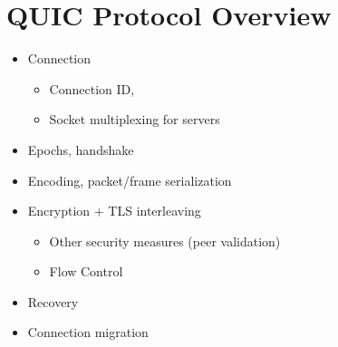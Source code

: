 \chapter{QUIC Protocol Overview}

\begin{itemize}

    \item Connection
    \begin{itemize}

        \item Connection ID,
        \item Socket multiplexing for servers

    \end{itemize}

    \item Epochs, handshake
    \item Encoding, packet/frame serialization

    \item Encryption + TLS interleaving
    \begin{itemize}

        \item Other security measures (peer validation)
        \item Flow Control

    \end{itemize}

    \item Recovery
    \item Connection migration

\end{itemize}
